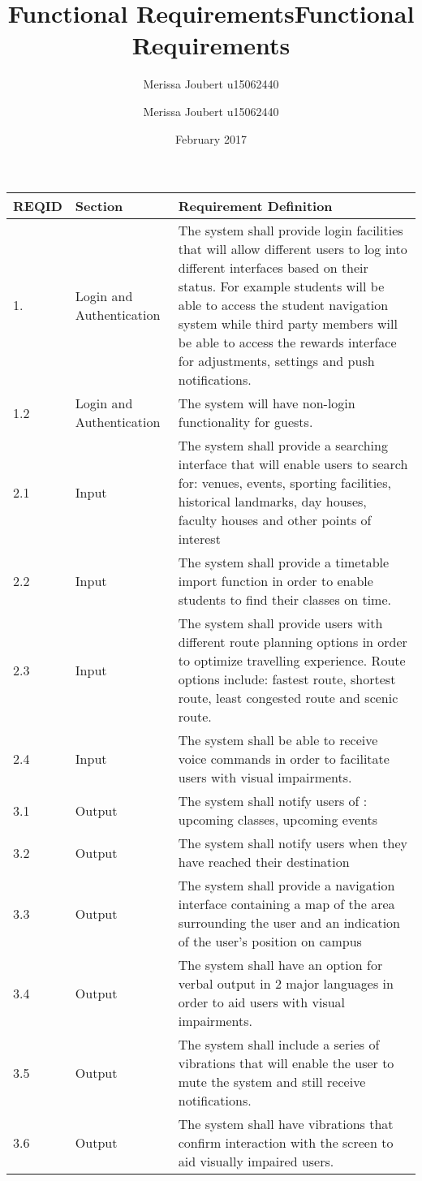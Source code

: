 \documentclass[12pt,a4paper]{report}
\author{Merissa Joubert u15062440}
\title{Functional Requirements}
\title{Functional Requirements}
\author{Merissa Joubert u15062440}
\date{February 2017}
\begin{document}
\pagebreak 

\begin{longtable}{|p{}| p{} | p{} |}
\hline
REQID& Section & Requirement Definition \\
\hline
1.& Login and Authentication & The system shall provide login facilities that will allow different users to log into different interfaces based on their status. For example students will be able to access the student navigation system while third party members will be able to access the rewards interface for adjustments, settings and push notifications.  \\
\hline
1.2& Login and Authentication   & The system will have non-login functionality for guests. \\
\hline
2.1& Input & The system shall provide a searching interface that will enable users to search for: venues, events, sporting facilities, historical landmarks, day houses, faculty houses and other points of interest  \\
\hline
2.2& Input  & The system shall provide a timetable import function in order to enable students to find their classes on time.  \\
\hline
2.3& Input  & The system shall provide users with different route planning options in order to optimize travelling experience. Route options include: fastest route, shortest route, least congested route and scenic route. \\
\hline
2.4& Input  & The system shall be able to receive voice commands in order to facilitate users with visual impairments.\\
\hline
3.1& Output & The system shall notify users of : upcoming classes, upcoming events\\
\hline
3.2& Output &The system shall notify users when they have reached their destination \\
\hline
3.3& Output & The system shall provide a navigation interface containing a map of the area surrounding the user and an indication of the user's position on campus\\
\hline
3.4& Output & The system shall have an option for verbal output in 2 major languages in order to aid users with visual impairments.\\
\hline
3.5& Output & The system shall include a series of vibrations that will enable the user to mute the system and still receive notifications.\\
\hline
3.6& Output & The system shall have vibrations that confirm interaction with the screen to aid visually impaired users.\\

\end{longtable}
\end{document}
